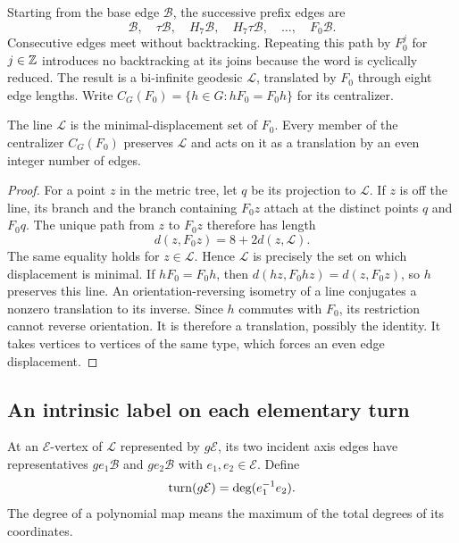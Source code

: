 Starting from the base edge $\mathcal B$, the successive prefix edges
are
\begin{equation}\label{eq:prefix-edges}
  \mathcal B,\quad \tau\mathcal B,\quad
  H_7\mathcal B,\quad H_7\tau\mathcal B,\quad
  \ldots,\quad F_0\mathcal B.
\end{equation}
Consecutive edges meet without backtracking. Repeating this path by
$F_0^j$ for $j\in\mathbb Z$ introduces no backtracking at its joins because
the word is cyclically reduced. The result is a bi-infinite geodesic
$\mathcal L$, translated by $F_0$ through eight edge lengths.
Write $C_G(F_0)=\{h\in G:hF_0=F_0h\}$ for its centralizer.

\begin{lemma}\label{lem:axis}
The line $\mathcal L$ is the minimal-displacement set of $F_0$.
Every member of the centralizer $C_G(F_0)$ preserves $\mathcal L$
and acts on it as a translation by an even integer number of edges.
\end{lemma}

\begin{proof}
For a point $z$ in the metric tree, let $q$ be its projection to
$\mathcal L$. If $z$ is off the line, its branch and the branch
containing $F_0z$ attach at the distinct points $q$ and $F_0q$.
The unique path from $z$ to $F_0z$ therefore has length
\begin{equation}\label{eq:displacement}
  d(z,F_0z)=8+2d(z,\mathcal L).
\end{equation}
The same equality holds for $z\in\mathcal L$.
Hence $\mathcal L$ is precisely the set on which displacement is
minimal. If $hF_0=F_0h$, then
$d(hz,F_0hz)=d(z,F_0z)$, so $h$ preserves this line.
An orientation-reversing isometry of a line conjugates a nonzero
translation to its inverse. Since $h$ commutes with $F_0$, its
restriction cannot reverse orientation. It is therefore a
translation, possibly the identity. It takes vertices to vertices
of the same type, which forces an even edge displacement.
\end{proof}

\subsection{An intrinsic label on each elementary turn}

At an $\mathcal E$-vertex of $\mathcal L$ represented by
$g\mathcal E$, its two incident axis edges have representatives
$ge_1\mathcal B$ and $ge_2\mathcal B$ with $e_1,e_2\in\mathcal E$.
Define
\begin{equation}\label{eq:turn}
  \operatorname{turn}(g\mathcal E)=\deg(e_1^{-1}e_2).
\end{equation}
The degree of a polynomial map means the maximum of the total
degrees of its coordinates.


